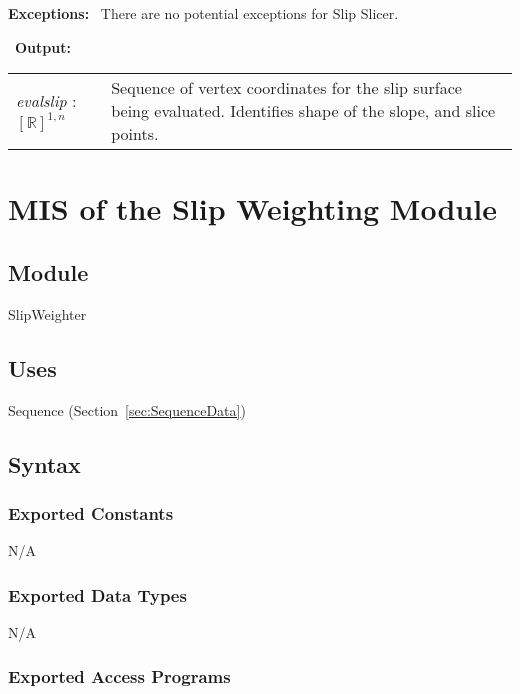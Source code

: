 \documentclass[12pt, titlepage]{article}
\begin{document}
\noindent \textbf{Exceptions:} ~\newline\noindent There are no
potential exceptions for Slip Slicer.

~\newline\noindent \textbf{Output:}
\renewcommand*{\arraystretch}{1.5}
\begin{longtable}{p{} p{}}
  \textit{evalslip} : $[\mathbb{R}]^{1,n}$ & Sequence of vertex
  coordinates for the slip surface being evaluated. Identifies shape
  of the slope, and slice points. \\
\end{longtable}


\section{MIS of the Slip Weighting
  Module} \label{sec:WeightMod}

\subsection{Module}
SlipWeighter

\subsection{Uses}
Sequence (Section~\ref{sec:SequenceData})

\subsection{Syntax}

\subsubsection{Exported Constants}
N/A

\subsubsection{Exported Data Types}
N/A

\subsubsection{Exported Access Programs}
\end{document}
